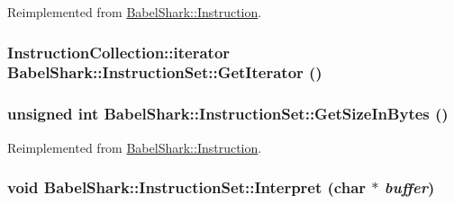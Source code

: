 Reimplemented from \hyperlink{class_babel_shark_1_1_instruction_709aac58cbdc516fcedc3bbcdd94795d}{BabelShark::Instruction}.\hypertarget{class_babel_shark_1_1_instruction_set_e6717a54fcb2da5282b52fbf506fa8bb}{
\subsubsection[{GetIterator}]{\setlength{\rightskip}{0pt plus 5cm}InstructionCollection::iterator BabelShark::InstructionSet::GetIterator ()}}
\label{class_babel_shark_1_1_instruction_set_e6717a54fcb2da5282b52fbf506fa8bb}


\hypertarget{class_babel_shark_1_1_instruction_set_5f11c971baf5eba34cc825a65ab51ba9}{
\subsubsection[{GetSizeInBytes}]{\setlength{\rightskip}{0pt plus 5cm}unsigned int BabelShark::InstructionSet::GetSizeInBytes ()}}
\label{class_babel_shark_1_1_instruction_set_5f11c971baf5eba34cc825a65ab51ba9}




Reimplemented from \hyperlink{class_babel_shark_1_1_instruction_4d24b597fc26a85423d9f9cf79dc9709}{BabelShark::Instruction}.\hypertarget{class_babel_shark_1_1_instruction_set_4d4c66b375e0f15de7775b295e15b558}{
\subsubsection[{Interpret}]{\setlength{\rightskip}{0pt plus 5cm}void BabelShark::InstructionSet::Interpret (char $\ast$ {\em buffer})}}
\label{class_babel_shark_1_1_instruction_set_4d4c66b375e0f15de7775b295e15b558}




